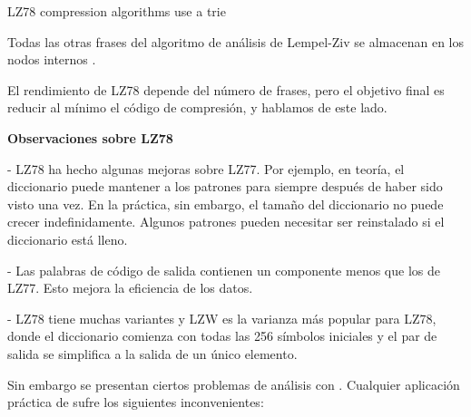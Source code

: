 LZ78 compression algorithms use a trie


Todas las otras frases del algoritmo de análisis de Lempel-Ziv se almacenan en los nodos internos .



El rendimiento de LZ78 depende del número de frases, pero el objetivo final es reducir al mínimo el código de compresión, y hablamos de este lado.








\textbf{Observaciones sobre LZ78}


- LZ78 ha hecho algunas mejoras sobre LZ77. 
Por ejemplo, en teoría, el diccionario puede mantener a los 
patrones para siempre después de haber sido visto una vez. 
En la práctica, sin embargo, el tamaño del diccionario 
no puede crecer indefinidamente. 
Algunos patrones pueden necesitar ser reinstalado si el diccionario está lleno.

- Las palabras de código de salida contienen un componente 
menos que los de LZ77. Esto mejora la eficiencia de los datos.

- LZ78 tiene muchas variantes y LZW es la varianza más popular para LZ78, 
donde el diccionario comienza con todas las 256 símbolos iniciales 
y el par de salida se simplifica a la salida de un único elemento.





Sin embargo se presentan ciertos problemas de análisis con \lzSieteOcho. Cualquier aplicación práctica de \lzSieteOcho sufre  los siguientes inconvenientes: 

